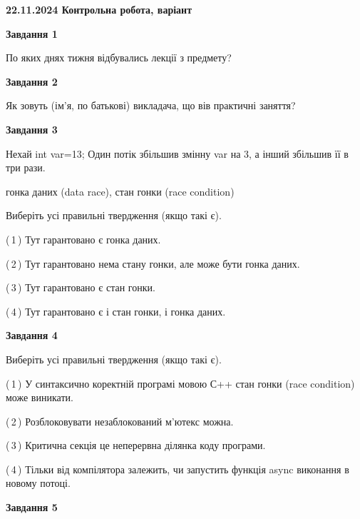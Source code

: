 \documentclass[12pt, ukrainian]{article}
\begin{document}
\begin {large}

\textbf{22.11.2024 Контрольна робота, варіант  }\par


{

\begin{center}
\textbf{Завдання 1}
\end{center}

По яких днях тижня відбувались лекції з предмету?


\begin{center}
\textbf{Завдання 2}
\end{center}

Як зовуть (ім'я, по батькові) викладача, що вів практичні заняття?


\begin{center}
\textbf{Завдання 3}
\end{center}

Нехай int var=13; Один потік збільшив змінну var на 3, а інший збільшив її в три рази.

гонка даних (data race), стан гонки (race condition)

Виберіть усі правильні твердження (якщо такі є).\par
\vspace{2mm}
(\,1\,) Тут гарантовано є гонка даних.%

(\,2\,) Тут гарантовано нема стану гонки, але може бути гонка даних.%

(\,3\,) Тут гарантовано є стан гонки.%

(\,4\,) Тут гарантовано є і стан гонки, і гонка даних.%


\begin{center}
\textbf{Завдання 4}
\end{center}

Виберіть усі правильні твердження (якщо такі є).\par
\vspace{2mm}

(\,1\,) У синтаксично коректній програмі мовою С++ стан гонки (race condition) може виникати.%

(\,2\,) Розблоковувати незаблокований м’ютекс можна.%

(\,3\,) Критична секція це неперервна ділянка коду програми.%

(\,4\,) Тільки від компілятора залежить, чи запустить функція async виконання в новому потоці.%


\begin{center}
\textbf{Завдання 5}
\end{center}

}
\end{large}
\end{document}

